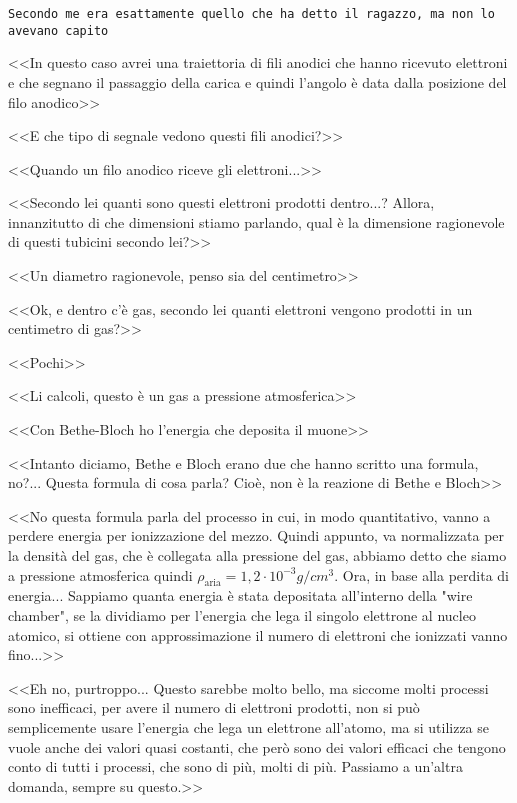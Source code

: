 \documentclass[../main.tex]{subfiles}
\begin{document}
\begin{enumerate}
{    \texttt{Secondo me era esattamente quello che ha detto il ragazzo, ma non lo avevano capito}
    \begin{flushright}
    <<In questo caso avrei una traiettoria di fili anodici che hanno ricevuto elettroni e che segnano il passaggio della carica e quindi l'angolo è data dalla posizione del filo anodico>>
    \end{flushright}
    <<E che tipo di segnale vedono questi fili anodici?>>
    \begin{flushright}
    <<Quando un filo anodico riceve gli elettroni...>>
    \end{flushright}
    <<Secondo lei quanti sono questi elettroni prodotti dentro...? Allora, innanzitutto di che dimensioni stiamo parlando, qual è la dimensione ragionevole di questi tubicini secondo lei?>>
    \begin{flushright}
    <<Un diametro ragionevole, penso sia del centimetro>>
    \end{flushright}
    <<Ok, e dentro c'è gas, secondo lei quanti elettroni vengono prodotti in un centimetro di gas?>>
    \begin{flushright}
    <<Pochi>>
    \end{flushright}
    <<Li calcoli, questo è un gas a pressione atmosferica>>
    \begin{flushright}
    <<Con Bethe-Bloch ho l'energia che deposita il muone>>
    \end{flushright}
    <<Intanto diciamo, Bethe e Bloch erano due che hanno scritto una formula, no?... Questa formula di cosa parla? Cioè, non è la reazione di Bethe e Bloch>>
    \begin{flushright}
    <<No questa formula parla del processo in cui, in modo quantitativo, vanno a perdere energia per ionizzazione del mezzo. Quindi appunto, va normalizzata per la densità del gas, che è collegata alla pressione del gas, abbiamo detto che siamo a pressione atmosferica quindi $\rho_{\textrm{aria}}=1,2\cdot10^{-3}g/cm^3$. Ora, in base alla perdita di energia... Sappiamo quanta energia è stata depositata all'interno della "wire chamber", se la dividiamo per l'energia che lega il singolo elettrone al nucleo atomico, si ottiene con approssimazione il numero di elettroni che ionizzati vanno fino...>>
    \end{flushright}
    <<Eh no, purtroppo... Questo sarebbe molto bello, ma siccome molti processi sono inefficaci, per avere il numero di elettroni prodotti, non si può semplicemente usare l'energia che lega un elettrone all'atomo, ma si utilizza se vuole anche dei valori quasi costanti, che però sono dei valori efficaci che tengono conto di tutti i processi, che sono di più, molti di più. Passiamo a un'altra domanda, sempre su questo.>>
}
\end{enumerate}
\end{document}
